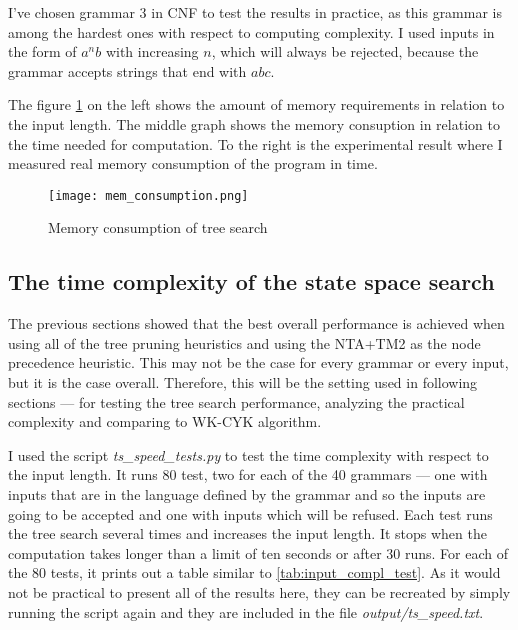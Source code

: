 I've chosen grammar 3 in CNF to test the results in practice, as this grammar is among the hardest ones with respect to computing complexity. I used inputs in the form of $a^nb$ with increasing $n$, which will always be rejected, because the grammar accepts strings that end with $abc$.

The figure \ref{fig:mem_consumption} on the left shows the amount of memory requirements in relation to the input length. The middle graph shows the memory consuption in relation to the time needed for computation. To the right is the experimental result where I measured real memory consumption of the program in time.

\begin{figure}[h]
  \texttt{[image: mem\_consumption.png]}
  \caption{Memory consumption of tree search}
  \label{fig:mem_consumption}
\end{figure}


\subsection{The time complexity of the state space search}
The previous sections showed that the best overall performance is achieved when using all of the tree pruning heuristics and using the NTA+TM2 as the node precedence heuristic. This may not be the case for every grammar or every input, but it is the case overall. Therefore, this will be the setting used in following sections --- for testing the tree search performance, analyzing the practical complexity and comparing to WK-CYK algorithm.

I used the script \textit{ts\_speed\_tests.py} to test the time complexity with respect to the input length. It runs 80 test, two for each of the 40 grammars --- one with inputs that are in the language defined by the grammar and so the inputs are going to be accepted and one with inputs which will be refused. Each test runs the tree search several times and increases the input length. It stops when the computation takes longer than a limit of ten seconds or after 30 runs. For each of the 80 tests, it prints out a table similar to \ref{tab:input_compl_test}. As it would not be practical to present all of the results here, they can be recreated by simply running the script again and they are included in the file \textit{output/ts\_speed.txt}.

